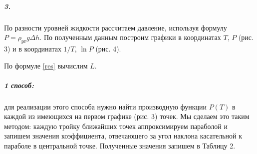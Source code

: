 \documentclass[a4paper, 12pt]{article}
\begin{document}
\subparagraph*{3.}  По разности уровней жидкости рассчитаем давление, используя формулу $P = \rho_{рт} g \Delta h$. По полученным данным построим графики в координатах $T$,  $P$ (рис. 3)  и в координатах $1/T$,  $\ln P$ (рис. 4). 

По формуле \eqref{res} вычислим $L$.


\subparagraph*{1 способ:} для реализации этого способа нужно найти производную функции $P(T)$ в каждой из имеющихся на первом графике (рис. 3) точек. Мы сделаем это таким методом: каждую тройку ближайших точек аппроксимируем параболой и запишем значения коэффициента, отвечающего за угол наклона касательной к параболе в центральной точке. Полученные значения запишем в Таблицу 2.
\end{document}
